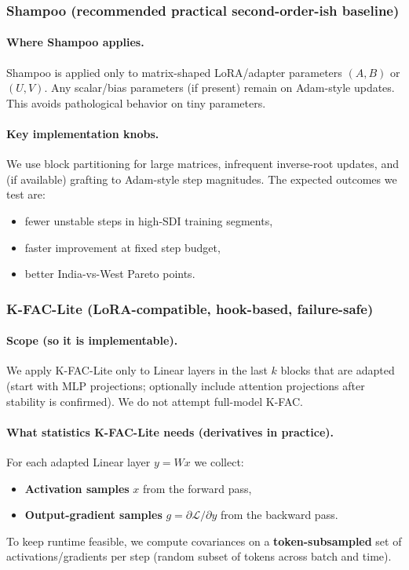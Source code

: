 \subsubsection{Shampoo (recommended practical second-order-ish baseline)}
\label{sec:shampoo_plan}

\paragraph{Where Shampoo applies.}
Shampoo is applied only to matrix-shaped LoRA/adapter parameters $(A,B)$ or $(U,V)$. Any scalar/bias parameters (if present) remain on Adam-style updates. This avoids pathological behavior on tiny parameters.

\paragraph{Key implementation knobs.}
We use block partitioning for large matrices, infrequent inverse-root updates, and (if available) grafting to Adam-style step magnitudes. The expected outcomes we test are:
\begin{itemize}[leftmargin=*,itemsep=2pt]
\item fewer unstable steps in high-SDI training segments,
\item faster improvement at fixed step budget,
\item better India-vs-West Pareto points.
\end{itemize}

\subsubsection{K-FAC-Lite (LoRA-compatible, hook-based, failure-safe)}
\label{sec:kfac_lite_plan}

\paragraph{Scope (so it is implementable).}
We apply K-FAC-Lite only to Linear layers in the last $k$ blocks that are adapted (start with MLP projections; optionally include attention projections after stability is confirmed). We do not attempt full-model K-FAC.

\paragraph{What statistics K-FAC-Lite needs (derivatives in practice).}
For each adapted Linear layer $y = W x$ we collect:
\begin{itemize}[leftmargin=*,itemsep=2pt]
\item \textbf{Activation samples} $x$ from the forward pass,
\item \textbf{Output-gradient samples} $g=\partial \mathcal{L}/\partial y$ from the backward pass.
\end{itemize}
To keep runtime feasible, we compute covariances on a \textbf{token-subsampled} set of activations/gradients per step (random subset of tokens across batch and time).

